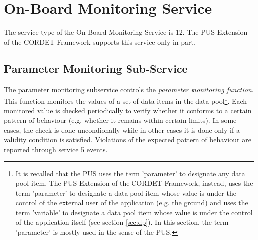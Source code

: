 \documentclass{pnp_article}
\begin{document}











\section{On-Board Monitoring Service}\label{sec:serv12}
The service type of the On-Board Monitoring Service is 12. The PUS Extension of the CORDET Framework supports this service only in part.

\subsection{Parameter Monitoring Sub-Service}
The parameter monitoring subservice controls the \textit{parameter monitoring function}. This function monitors the values of a set of data items in the data pool\footnote{It is recalled that the PUS uses the term 'parameter' to designate any data pool item. The PUS Extension of the CORDET Framework, instead, uses the term 'parameter' to designate a data pool item whose value is under the control of the external user of the application (e.g. the ground) and uses the term 'variable' to designate a data pool item whose value is under the control of the application itself (see section \ref{sec:dp}). In this section, the term 'parameter' is mostly used in the sense of the PUS.}. Each monitored value is checked periodically to verify whether it conforms to a certain pattern of behaviour (e.g. whether it remains within certain limits). In some cases, the check is done uncondionally while in other cases it is done only if a validity condition is satisfied. Violations of the expected pattern of behaviour are reported through service 5 events. 
\end{document}
